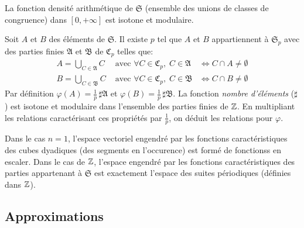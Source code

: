 \begin{propn}
 La fonction densité arithmétique de $\mathfrak{S}$ (ensemble des unions de classes de congruence) dans $[0, +\infty]$ est isotone et modulaire.
\end{propn}
\begin{demo}
  Soit $A$ et $B$ des éléments de $\mathfrak{S}$. Il existe $p$ tel que $A$ et $B$ appartiennent à $\mathfrak{S}_p$ avec des parties finies $\mathfrak{A}$ et $\mathfrak{B}$ de $\mathfrak{C}_p$ telles que:
  \begin{displaymath}
   \begin{aligned}
      A = \bigcup_{C\in \mathfrak{A}} C &\text{ avec } \forall C \in \mathfrak{C}_p,\; C \in \mathfrak{A} &\Leftrightarrow C \cap A \neq \emptyset  \\
      B = \bigcup_{C\in \mathfrak{B}} C &\text{ avec } \forall C \in \mathfrak{C}_p,\; C \in \mathfrak{B} &\Leftrightarrow C \cap B \neq \emptyset
   \end{aligned}
  \end{displaymath}
Par définition $\varphi(A) = \frac{1}{p}\, \sharp \mathfrak{A}$ et $\varphi(B) = \frac{1}{p}\, \sharp \mathfrak{B}$. La fonction \emph{nombre d'éléments} ($\sharp$) est isotone et modulaire dans l'ensemble des parties finies de $\mathbb{Z}$. En multipliant les relations caractérisant ces propriétés par $\frac{1}{p}$, on déduit les relations pour $\varphi$.
\end{demo}
\begin{rem}
  Dans le cas $n=1$, l'espace vectoriel engendré par les fonctions caractéristiques des cubes dyadiques (des segments en l'occurence) est formé de fonctionss en escaler.\newline
  Dans le cas de $\mathbb{Z}$, l'espace engendré par les fonctions caractéristiques des parties appartenant à $\mathfrak{S}$ est exactement l'espace des suites périodiques (définies dans $\mathbb{Z}$).
\end{rem}

\subsection{Approximations}\label{Approximations}\label{Expleppal}

